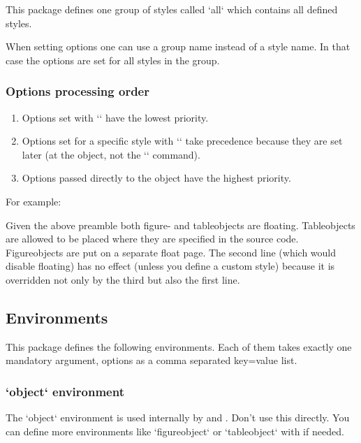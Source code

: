 This package defines one group of styles called `all` which contains all defined styles.

When setting options one can use a group name instead of a style name.
In that case the options are set for all styles in the group.

\subsubsection{Options processing order}
\label{options-processing-order}

\begin{enumerate}
\item Options set with `` have the lowest priority.
\item Options set for a specific style with `` take precedence because they are set later (at the object, not the `\objectset` command).
\item Options passed directly to the object have the highest priority.
\end{enumerate}

For example:

\begin{examplecode}
\end{examplecode}

Given the above preamble both figure- and tableobjects are floating.
Tableobjects are allowed to be placed where they are specified in the source code.
Figureobjects are put on a separate float page.
The second line (which would disable floating) has no effect (unless you define a custom style) because it is overridden not only by the third but also the first line.


\subsection{Environments}
\label{environments}

This package defines the following environments.
Each of them takes exactly one mandatory argument,
options as a comma separated key=value list.

\subsubsection{`object` environment}
\label{object-environment}
\begingroup
{}
The `object` environment is used internally by  and .
Don't use this directly.
You can define more environments like `figureobject` or `tableobject` with \cmd{\NewObjectStyle} if needed.

